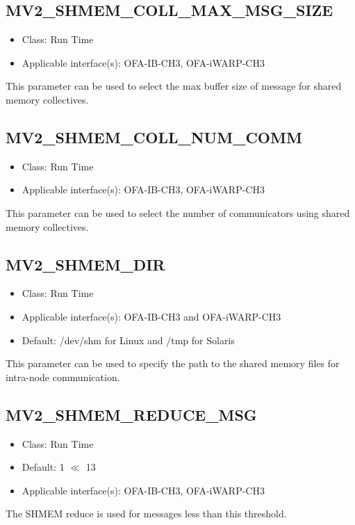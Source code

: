 \subsection{MV2\_SHMEM\_COLL\_MAX\_MSG\_SIZE}
\label{def:shmem-coll-max-msg-size}
\begin{itemize}
    \item Class: Run Time
    \item Applicable interface(s): OFA-IB-CH3, OFA-iWARP-CH3
\end{itemize}
This parameter can be used to select the max buffer size of message
for shared memory collectives.

\subsection{MV2\_SHMEM\_COLL\_NUM\_COMM}
\label{def:shmem-coll-num-comm}
\begin{itemize}
    \item Class: Run Time
    \item Applicable interface(s): OFA-IB-CH3, OFA-iWARP-CH3
\end{itemize}
This parameter can be used to select the number of communicators
using shared memory collectives.

\subsection{MV2\_SHMEM\_DIR}
\label{def:shmem-dir}
\begin{itemize}
    \item Class: Run Time
    \item Applicable interface(s): OFA-IB-CH3 and OFA-iWARP-CH3
    \item Default: /dev/shm for Linux and /tmp for Solaris
\end{itemize}
This parameter can be used to specify the path to the shared memory
files for intra-node communication.

\subsection{MV2\_SHMEM\_REDUCE\_MSG}
\label{def:mv2-shmem-coll-reduce-threshold}
\begin{itemize}
    \item Class: Run Time
    \item Default: 1 $\ll$ 13
    \item Applicable interface(s): OFA-IB-CH3, OFA-iWARP-CH3
\end{itemize}
The SHMEM reduce is used for messages less than this threshold.

